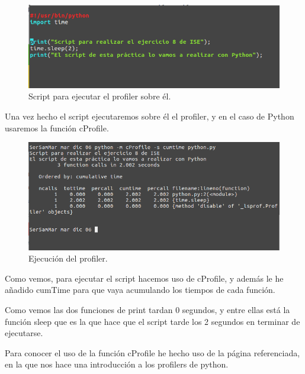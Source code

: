\begin{figure}[H] %
	\centering
	\includegraphics[scale=0.5]{imagenes/script-python.png}  %
	\caption{Script para ejecutar el profiler sobre él.}
\end{figure}

Una vez hecho el script ejecutaremos sobre él el profiler, y en el caso de Python usaremos la función cProfile.

\begin{figure}[H] %
	\centering
	\includegraphics[scale=0.5]{imagenes/profiler-python.png}  %
	\caption{Ejecución del profiler.}
\end{figure}

Como vemos, para ejecutar el script hacemos uso de cProfile, y además le he añadido cumTime para que vaya acumulando los tiempos de cada función.

Como vemos las dos funciones de print tardan 0 segundos, y entre ellas está la función sleep que es la que hace que el script tarde los 2 segundos en terminar de ejecutarse.

Para conocer el uso de la función cProfile he hecho uso de la página referenciada,\cite{profiler-python} en la que nos hace una introducción a los profilers de python.





